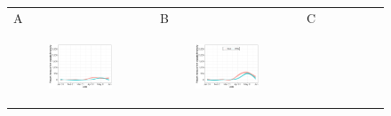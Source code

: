 \documentclass[11pt]{article}
\begin{document}
\begin{figure}[ht]
	\begin{tabular}{lll}
	A&B&C\\
	\begin{subfigure}[t]{0.3\linewidth}
		\centering
		\includegraphics[width=1\linewidth]{figs/figure-3a.pdf} 
	\end{subfigure}&
	\begin{subfigure}[t]{0.3\linewidth}
		\centering
		\includegraphics[width=1\linewidth]{figs/figure-3b.pdf}
	\end{subfigure}&
	\begin{subfigure}[t]{0.3\linewidth}
		\centering

\end{subfigure}
\end{tabular}
\end{figure}
\end{document}
